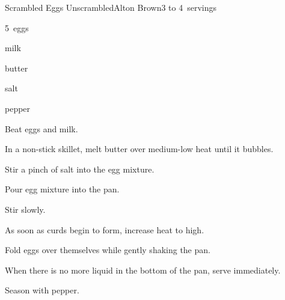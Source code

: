 \begin{recipe}{Scrambled Eggs Unscrambled}{Alton Brown}{3 to 4~servings}

\begin{ingredients}
\item 5~eggs
\item {} milk
\item butter
\item salt
\item pepper
\end{ingredients}

\begin{directions}
\item Beat eggs and milk.
\item In a non-stick skillet, melt butter over medium-low heat until it bubbles.
\item Stir a pinch of salt into the egg mixture.
\item Pour egg mixture into the pan.
\item Stir slowly.
\item As soon as curds begin to form, increase heat to high.
\item Fold eggs over themselves while gently shaking the pan.
\item When there is no more liquid in the bottom of the pan, serve immediately.
\item Season with pepper.
\end{directions}

\end{recipe}

